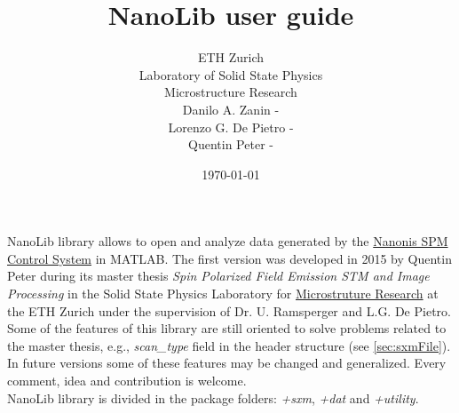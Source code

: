 

\usepackage{amsmath}

\newcommand{\mcode}[1]{\texttt{>\.> #1}}

\renewcommand{\familydefault}{\sfdefault}
\setlength\parindent{0pt}

\newcommand{\+}[1]{\item \textbf{#1}}

\newcommand{\nanonis}{\href{http://www.specs-zurich.com/en/home.html;jsessionid=FCD8A587EE447665C3F4A8CC374671EE}{Nanonis SPM Control System\texttrademark}}
\newcommand{\matlab}{MATLAB\texttrademark}


\title{NanoLib user guide}
\author{
ETH Zurich\\
Laboratory of Solid State Physics\\\vspace{.5em}
Microstructure Research\\ 
{\small Danilo A. Zanin - }\\
{\small Lorenzo G. De Pietro - }\\
{\small Quentin Peter - }
}

\date{\today}


\maketitle
NanoLib library allows to open and analyze data generated by the \nanonis{} in \matlab.
The first version was developed in 2015 by Quentin Peter during its master thesis \emph{Spin Polarized Field Emission STM and Image Processing} in the Solid State Physics Laboratory for \href{http://www.microstructure.ethz.ch}{Microstruture Research} at the ETH Zurich under the supervision of Dr. U. Ramsperger and L.G. De Pietro.
Some of the features of this library are still oriented to solve problems related to the master  thesis, e.g., \emph{scan\_type} field in the header structure (see \ref{sec:sxmFile}). 
In future versions some of these features may be changed and generalized. Every comment, idea and contribution is welcome.\\

NanoLib library is divided in the package folders: \emph{+sxm}, \emph{+dat} and \emph{+utility}.

